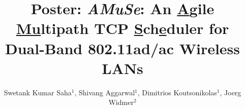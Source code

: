 \documentclass[10pt,sigconf]{acmart}
\begin{document}
\fancyhead{}
\newcommand{\name}{\emph{AMuSe}\xspace}

\title{Poster: \name: An \underline{A}gile \underline{Mu}ltipath TCP \underline{S}ch\underline{e}duler for Dual-Band 802.11ad/ac Wireless LANs}

\author{Swetank Kumar Saha$^1$, Shivang Aggarwal$^1$, Dimitrios Koutsonikolas$^1$, Joerg Widmer$^2$}

\begin{comment}
\author{Lars Th{\o}rv{\"a}ld}
\authornote{This author is the
  one who did all the really hard work.}
\affiliation{%
  \institution{The Th{\o}rv{\"a}ld Group}
  \streetaddress{1 Th{\o}rv{\"a}ld Circle}
  \city{Hekla}
  \country{Iceland}}
\email{larst@affiliation.org}

\author{Valerie B\'eranger}
\affiliation{%
  \institution{Inria Paris-Rocquencourt}
  \city{Rocquencourt}
  \country{France}
}
\author{Aparna Patel}
\affiliation{%
 \institution{Rajiv Gandhi University}
 \streetaddress{Rono-Hills}
 \city{Doimukh}
 \state{Arunachal Pradesh}
 \country{India}}
\author{Huifen Chan}
\affiliation{%
  \institution{Tsinghua University}
  \streetaddress{30 Shuangqing Rd}
  \city{Haidian Qu}
  \state{Beijing Shi}
  \country{China}
}

\author{Charles Palmer}
\affiliation{%
  \institution{Palmer Research Laboratories}
  \streetaddress{8600 Datapoint Drive}
  \city{San Antonio}
  \state{Texas}
  \postcode{78229}}
\email{cpalmer@prl.com}

\author{John Smith}
\affiliation{\institution{The Th{\o}rv{\"a}ld Group}}
\email{jsmith@affiliation.org}

\author{Julius P.~Kumquat}
\affiliation{\institution{The Kumquat Consortium}}
\email{jpkumquat@consortium.net}
\end{comment}
\end{document}
